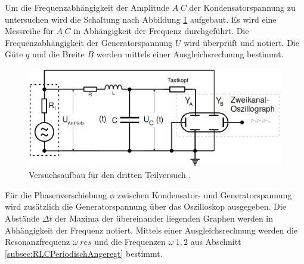 Um die Frequenzabhängigkeit der Amplitude $A_.C$ der Kondensatorspannung zu untersuchen wird die Schaltung nach Abbildung \ref{fig:Aufgabec} aufgebaut. Es wird eine Messreihe für $A_.C$ in Abhängigkeit der Frequenz durchgeführt. Die Frequenzabhängigkeit der Generatorspannung $U$ wird überprüft und notiert. Die Güte $q$ und die Breite $B$ werden mittels einer Ausgleichsrechnung bestimmt.

\begin{figure}
\centering
\includegraphics[width=\linewidth-200pt,height=\textheight-200pt,keepaspectratio]{content/images/Aufgabec.png}
\caption{Versuchsaufbau für den dritten Teilversuch \cite{V354}.}
\label{fig:Aufgabec}
\end{figure}

\noindent Für die Phasenverschiebung $\phi$ zwischen Kondensator- und Generatorspannung wird zusätzlich die Generatorspannung über das Oszilloskop ausgegeben. Die Abstände $\Delta t$ der Maxima der übereinander liegenden Graphen werden in Abhängigkeit der Frequenz notiert. Mittels einer Ausgleichsrechnung werden die Resonanzfrequenz $\omega_.{res}$ und die Frequenzen $\omega_.{1,2}$ aus Abschnitt \ref{subsec:RLCPeriodischAngeregt} bestimmt.
